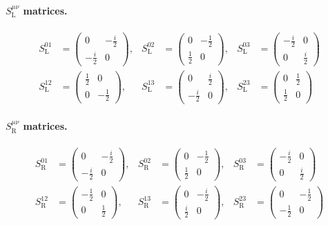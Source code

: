 \documentclass[12pt]{article}
\begin{document}
\paragraph{\texorpdfstring{$S^{\mu\nu}_{\mathrm{L}}$}{SL} matrices.}
\begin{align*}
  S^{01}_{\mathrm{L}} &= \begin{pmatrix}0 & -\tfrac{i}{2} \\ -\tfrac{i}{2} & 0\end{pmatrix},&
  S^{02}_{\mathrm{L}} &= \begin{pmatrix}0 & -\tfrac{1}{2} \\ \tfrac{1}{2} & 0\end{pmatrix},&
  S^{03}_{\mathrm{L}} &= \begin{pmatrix}-\tfrac{i}{2} & 0 \\ 0 & \tfrac{i}{2}\end{pmatrix}\\[6pt]
  S^{12}_{\mathrm{L}} &= \begin{pmatrix}\tfrac{1}{2} & 0 \\ 0 & -\tfrac{1}{2}\end{pmatrix},&
  S^{13}_{\mathrm{L}} &= \begin{pmatrix}0 & \tfrac{i}{2} \\ -\tfrac{i}{2} & 0\end{pmatrix},&
  S^{23}_{\mathrm{L}} &= \begin{pmatrix}0 & \tfrac{1}{2} \\ \tfrac{1}{2} & 0\end{pmatrix}
\end{align*}

\paragraph{\texorpdfstring{$S^{\mu\nu}_{\mathrm{R}}$}{SR} matrices.}
\begin{align*}
  S^{01}_{\mathrm{R}} &= \begin{pmatrix}0 & -\tfrac{i}{2} \\ -\tfrac{i}{2} & 0\end{pmatrix},&
  S^{02}_{\mathrm{R}} &= \begin{pmatrix}0 & -\tfrac{1}{2} \\ \tfrac{1}{2} & 0\end{pmatrix},&
  S^{03}_{\mathrm{R}} &= \begin{pmatrix}-\tfrac{i}{2} & 0 \\ 0 & \tfrac{i}{2}\end{pmatrix}\\[6pt]
  S^{12}_{\mathrm{R}} &= \begin{pmatrix}-\tfrac{1}{2} & 0 \\ 0 & \tfrac{1}{2}\end{pmatrix},&
  S^{13}_{\mathrm{R}} &= \begin{pmatrix}0 & -\tfrac{i}{2} \\ \tfrac{i}{2} & 0\end{pmatrix},&
  S^{23}_{\mathrm{R}} &= \begin{pmatrix}0 & -\tfrac{1}{2} \\ -\tfrac{1}{2} & 0\end{pmatrix}
\end{align*}
\end{document}
